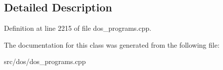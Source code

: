 \subsection{Detailed Description}


Definition at line 2215 of file dos\-\_\-programs.\-cpp.



The documentation for this class was generated from the following file\-:\begin{DoxyCompactItemize}
\item 
src/dos/dos\-\_\-programs.\-cpp\end{DoxyCompactItemize}
